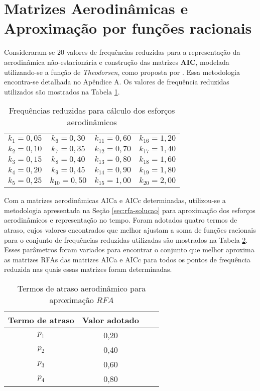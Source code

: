 \section{Matrizes Aerodinâmicas e Aproximação por funções racionais}\label{sec:resultados-aerodinamicos}

Consideraram-se $20$ valores de frequências reduzidas para a representação da aerodinâmica não-estacionária e construção das matrizes $\boldsymbol{AIC}$, modelada utilizando-se a função de \textit{Theodorsen}, como proposta por \textcite{book:Bisplinghoff}. Essa metodologia encontra-se detalhada no Apêndice A. Os valores de frequência reduzidas utilizados são mostrados na Tabela \ref{tab:reducedFrequencies}.

\begin{table}[h]
\centering
\caption{Frequências reduzidas para cálculo dos esforços aerodinâmicos}
\begin{tabular}{cccc} \hline
$k_{1} = 0,05$ & $k_{6} = 0,30$ & $k_{11} = 0,60$ & $k_{16} = 1,20$ \\
$k_{2} = 0,10$ & $k_{7} = 0,35$ & $k_{12} = 0,70$ & $k_{17} = 1,40$ \\
$k_{3} = 0,15$ & $k_{8} = 0,40$ & $k_{13} = 0,80$ & $k_{18} = 1,60$ \\
$k_{4} = 0,20$ & $k_{9} = 0,45$ & $k_{14} = 0,90$ & $k_{19} = 1,80$ \\
$k_{5} = 0,25$ & $k_{10} = 0,50$ & $k_{15} = 1,00$ & $k_{20} = 2,00$ \\ \hline
\end{tabular}
\label{tab:reducedFrequencies}
\end{table}

\newpage
Com a matrizes aerodinâmicas \gls{AICa} e \gls{AICc} determinadas, utilizou-se a metodologia apresentada na Seção \ref{sec:rfa-solucao} para aproximação dos esforços aerodinâmicos e representação no tempo. Foram adotados quatro termos de atraso, cujos valores encontrados que melhor ajustam a soma de funções racionais para o conjunto de frequências reduzidas utilizadas são mostrados na Tabela \ref{tab:lagParameters}. Esses parâmetros foram variados para encontrar o conjunto que melhor aproxima as matrizes \gls{RFA}s das matrizes \gls{AICa} e \gls{AICc} para todos os pontos de frequência reduzida nas quais essas matrizes foram determinadas.

\begin{table}[ht]
\centering
\caption{Termos de atraso aerodinâmico para aproximação $\textit{RFA}$}
\begin{tabular}{cccc}
Termo de atraso & Valor adotado \\ \hline
$p_{1}$ & 0,20 \\
$p_{2}$ & 0,40 \\
$p_{3}$ & 0,60 \\
$p_{4}$ & 0,80 \\ \hline
\end{tabular}
\label{tab:lagParameters}
\end{table}

